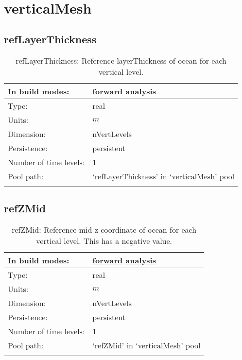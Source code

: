 \section[verticalMesh]{verticalMesh}
\label{sec:var_sec_verticalMesh}
\subsection[refLayerThickness]{refLayerThickness}
\label{subsec:var_sec_verticalMesh_refLayerThickness}
\begin{center}
\begin{longtable}{| p{2.0in} | p{4.0in} |}
        \hline 
        In build modes: & \hyperref[subsec:forward_var_tab_verticalMesh]{forward} \hyperref[subsec:analysis_var_tab_verticalMesh]{analysis} \\
        \hline 
        Type: & real \\
        \hline 
        Units: & $m$ \\
        \hline 
        Dimension: & nVertLevels \\
        \hline 
        Persistence: & persistent \\
        \hline 
        Number of time levels: & 1 \\
        \hline 
            Pool path: & `refLayerThickness' in `verticalMesh' pool \\
		 \hline 
    \caption{refLayerThickness: Reference layerThickness of ocean for each vertical level.}
\end{longtable}
\end{center}
\subsection[refZMid]{refZMid}
\label{subsec:var_sec_verticalMesh_refZMid}
\begin{center}
\begin{longtable}{| p{2.0in} | p{4.0in} |}
        \hline 
        In build modes: & \hyperref[subsec:forward_var_tab_verticalMesh]{forward} \hyperref[subsec:analysis_var_tab_verticalMesh]{analysis} \\
        \hline 
        Type: & real \\
        \hline 
        Units: & $m$ \\
        \hline 
        Dimension: & nVertLevels \\
        \hline 
        Persistence: & persistent \\
        \hline 
        Number of time levels: & 1 \\
        \hline 
            Pool path: & `refZMid' in `verticalMesh' pool \\
		 \hline 
    \caption{refZMid: Reference mid z-coordinate of ocean for each vertical level. This has a negative value.}
\end{longtable}
\end{center}
